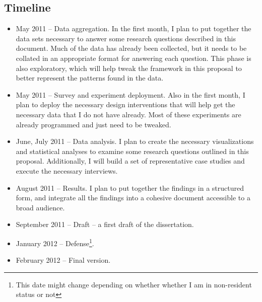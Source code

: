 \subsection{Timeline}
\begin{itemize}
\item May 2011 -- Data aggregation. In the first month, I plan to put together the data sets necessary to answer some research questions described in this document. Much of the data has already been collected, but it needs to be collated in an appropriate format for answering each question.
This phase is also exploratory, which will help tweak the framework in this proposal to better represent the patterns found in the data.
\item May 2011 -- Survey and experiment deployment. Also in the first month, I plan to deploy the necessary design interventions that will help get the necessary data that I do not have already. Most of these experiments are already programmed and just need to be tweaked.
\item June, July 2011 -- Data analysis. I plan to create the necessary visualizations and statistical analyses to examine some research questions outlined in this proposal. Additionally, I will build a set of representative case studies and execute the necessary interviews.
\item August 2011 -- Results. I plan to put together the findings in a structured form, and integrate all the findings into a cohesive document accessible to a broad audience.
\item September 2011 -- Draft -- a first draft of the dissertation.
\item January 2012 -- Defense\footnote{This date might change depending on whether whether I am in non-resident status or not}.
\item February 2012 -- Final version.
\end{itemize}
